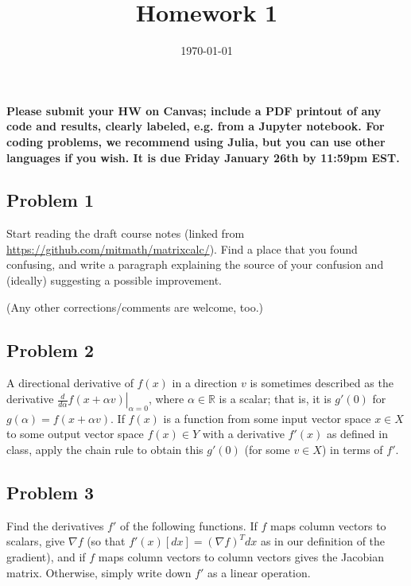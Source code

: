 \documentclass[10pt,oneside]{article}
\author{}
\title{Homework 1}
\date{\today}
\begin{document}
\maketitle
\thispagestyle{fancy} 

{\bf Please submit your HW on Canvas; include a PDF printout of any code and results, clearly labeled, e.g. from a Jupyter notebook.  For coding problems, we recommend using Julia, but you can use other languages if you wish. It is due Friday January 26th by 11:59pm EST.  }

\subsection*{Problem 1}

Start reading the draft course notes (linked from \url{https://github.com/mitmath/matrixcalc/}).   Find a place that you found confusing, and write a paragraph explaining the source of your confusion and (ideally) suggesting a possible improvement.

(Any other corrections/comments are welcome, too.)

\subsection*{Problem 2}

A directional derivative of $f(x)$ in a direction $v$ is sometimes described as the derivative $\left. \frac{d}{d\alpha} f(x + \alpha v) \right|_{\alpha = 0}$, where $\alpha \in \mathbb{R} $ is a scalar; that is, it is $g'(0)$ for $g(\alpha) = f(x + \alpha v)$.   If $f(x)$ is a function from some input vector space $x \in X$ to some output vector space $f(x) \in Y$ with a derivative $f'(x)$ as defined in class, apply the chain rule to obtain this $g'(0)$ (for some $v \in X$) in terms of $f'$.

\subsection*{Problem 3}

Find the derivatives $f'$ of the following functions.  If $f$ maps column vectors to scalars, give $\nabla f$ (so that $f'(x)[dx] = (\nabla f)^T dx$ as in our definition of the gradient), and if $f$ maps column vectors to column vectors gives the Jacobian matrix.  Otherwise, simply write down $f'$ as a linear operation.
\end{document}
